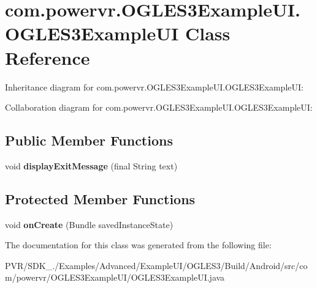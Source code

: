 \hypertarget{classcom_1_1powervr_1_1_o_g_l_e_s3_example_u_i_1_1_o_g_l_e_s3_example_u_i}{\section{com.\+powervr.\+O\+G\+L\+E\+S3\+Example\+U\+I.\+O\+G\+L\+E\+S3\+Example\+U\+I Class Reference}
\label{classcom_1_1powervr_1_1_o_g_l_e_s3_example_u_i_1_1_o_g_l_e_s3_example_u_i}
}


Inheritance diagram for com.\+powervr.\+O\+G\+L\+E\+S3\+Example\+U\+I.\+O\+G\+L\+E\+S3\+Example\+U\+I\+:


Collaboration diagram for com.\+powervr.\+O\+G\+L\+E\+S3\+Example\+U\+I.\+O\+G\+L\+E\+S3\+Example\+U\+I\+:
\subsection*{Public Member Functions}
\begin{DoxyCompactItemize}
\item 
\hypertarget{classcom_1_1powervr_1_1_o_g_l_e_s3_example_u_i_1_1_o_g_l_e_s3_example_u_i_a5ddd119a0bd7d584ef0d775b1dbf605e}{void {\bfseries display\+Exit\+Message} (final String text)}\label{classcom_1_1powervr_1_1_o_g_l_e_s3_example_u_i_1_1_o_g_l_e_s3_example_u_i_a5ddd119a0bd7d584ef0d775b1dbf605e}

\end{DoxyCompactItemize}
\subsection*{Protected Member Functions}
\begin{DoxyCompactItemize}
\item 
\hypertarget{classcom_1_1powervr_1_1_o_g_l_e_s3_example_u_i_1_1_o_g_l_e_s3_example_u_i_a211169228f72cd37d6fecd531b9711e7}{void {\bfseries on\+Create} (Bundle saved\+Instance\+State)}\label{classcom_1_1powervr_1_1_o_g_l_e_s3_example_u_i_1_1_o_g_l_e_s3_example_u_i_a211169228f72cd37d6fecd531b9711e7}

\end{DoxyCompactItemize}


The documentation for this class was generated from the following file\+:\begin{DoxyCompactItemize}
\item 
P\+V\+R/\+S\+D\+K\+\_./\+Examples/\+Advanced/\+Example\+U\+I/\+O\+G\+L\+E\+S3/\+Build/\+Android/src/com/powervr/\+O\+G\+L\+E\+S3\+Example\+U\+I/O\+G\+L\+E\+S3\+Example\+U\+I.\+java\end{DoxyCompactItemize}
